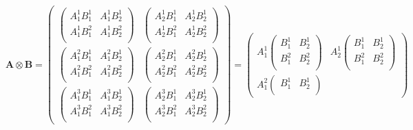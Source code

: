 \begin{equation}
  \mathbf{A} \otimes \mathbf{B} =
  \begin{pmatrix}
    \begin{pmatrix}
      A^1_1B^1_1 & A^1_1B^1_2 \\
      A^1_1B^2_1 & A^1_1B^2_2 \\
    \end{pmatrix}
    &
    \begin{pmatrix}
      A^1_2B^1_1 & A^1_2B^1_2 \\
      A^1_2B^2_1 & A^1_2B^2_2 \\
    \end{pmatrix}
    \\
    \begin{pmatrix}
      A^2_1B^1_1 & A^2_1B^1_2 \\
      A^2_1B^2_1 & A^2_1B^2_2 \\
    \end{pmatrix}
    &
    \begin{pmatrix}
      A^2_2B^1_1 & A^2_2B^1_2 \\
      A^2_2B^2_1 & A^2_2B^2_2 \\
    \end{pmatrix}
    \\
    \begin{pmatrix}
      A^3_1B^1_1 & A^3_1B^1_2 \\
      A^3_1B^2_1 & A^3_1B^2_2 \\
    \end{pmatrix}
    &
    \begin{pmatrix}
      A^3_2B^1_1 & A^3_2B^1_2 \\
      A^3_2B^2_1 & A^3_2B^2_2 \\
    \end{pmatrix}
  \end{pmatrix}
  =
  \begin{pmatrix}
    A^1_1
    \begin{pmatrix}
      B^1_1 & B^1_2 \\
      B^2_1 & B^2_2 \\
    \end{pmatrix}
    &
    A^1_2
    \begin{pmatrix}
      B^1_1 & B^1_2 \\
      B^2_1 & B^2_2 \\
    \end{pmatrix}
    \\
    A^2_1
    \begin{pmatrix}
      B^1_1 & B^1_2 \\

\end{pmatrix}
\end{pmatrix}
\end{equation}
